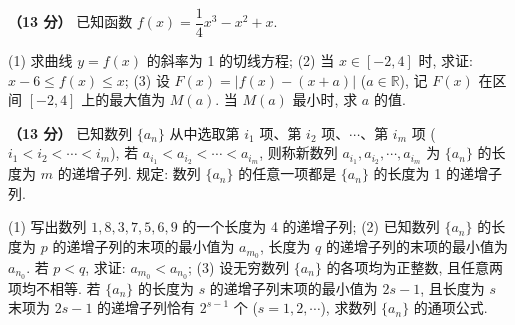 \begin{question}
\textbf{（13 分）} 
已知函数 $f(x) = \dfrac{1}{4}x^3 - x^2 + x$.

(1) 求曲线 $y = f(x)$ 的斜率为 1 的切线方程;  
(2) 当 $x \in [-2, 4]$ 时, 求证: $x - 6 \leqslant f(x) \leqslant x$;  
(3) 设 $F(x) = |f(x) - (x + a)|$ ($a \in \mathbb{R}$), 记 $F(x)$ 在区间 $[-2, 4]$ 上的最大值为 $M(a)$. 当 $M(a)$ 最小时, 求 $a$ 的值.

\end{question}
\begin{question}
\textbf{（13 分）} 
已知数列 $\{a_n\}$ 从中选取第 $i_1$ 项、第 $i_2$ 项、$\cdots$、第 $i_m$ 项 ($i_1 < i_2 < \cdots < i_m$), 若 $a_{i_1} < a_{i_2} < \cdots < a_{i_m}$, 则称新数列 $a_{i_1}, a_{i_2}, \cdots, a_{i_m}$ 为 $\{a_n\}$ 的长度为 $m$ 的递增子列. 规定: 数列 $\{a_n\}$ 的任意一项都是 $\{a_n\}$ 的长度为 1 的递增子列.

(1) 写出数列 $1, 8, 3, 7, 5, 6, 9$ 的一个长度为 4 的递增子列;  
(2) 已知数列 $\{a_n\}$ 的长度为 $p$ 的递增子列的末项的最小值为 $a_{m_0}$, 长度为 $q$ 的递增子列的末项的最小值为 $a_{n_0}$. 若 $p < q$, 求证: $a_{m_0} < a_{n_0}$;  
(3) 设无穷数列 $\{a_n\}$ 的各项均为正整数, 且任意两项均不相等. 若 $\{a_n\}$ 的长度为 $s$ 的递增子列末项的最小值为 $2s - 1$, 且长度为 $s$ 末项为 $2s - 1$ 的递增子列恰有 $2^{s-1}$ 个 ($s = 1, 2, \cdots$), 求数列 $\{a_n\}$ 的通项公式.

\end{question}